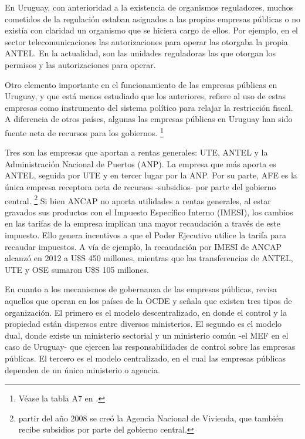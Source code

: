 \documentclass[
  12pt,
  spanish,
]{book}
\begin{document}
En Uruguay, con anterioridad a la existencia de organismos reguladores,
muchos cometidos de la regulación estaban asignados a las propias
empresas públicas o no existía con claridad un organismo que se hiciera
cargo de ellos. Por ejemplo, en el sector telecomunicaciones las
autorizaciones para operar las otorgaba la propia ANTEL. En la
actualidad, son las unidades reguladoras las que otorgan los permisos y
las autorizaciones para operar.

Otro elemento importante en el funcionamiento de las empresas públicas
en Uruguay, y que está menos estudiado que los anteriores, refiere al
uso de estas empresas como instrumento del sistema político para relajar
la restricción fiscal. A diferencia de otros países, algunas las
empresas públicas en Uruguay han sido fuente neta de recursos para los
gobiernos. \footnote{Véase la tabla A7 en \citet{WorldBank1995}.}

Tres son las empresas que aportan a rentas generales: UTE, ANTEL y la
Administración Nacional de Puertos (ANP). La empresa que más aporta es
ANTEL, seguida por UTE y en tercer lugar por la ANP. Por su parte, AFE
es la única empresa receptora neta de recursos -subsidios- por parte del
gobierno central. \footnote{partir del año 2008 se creó la Agencia
  Nacional de Vivienda, que también recibe subsidios por parte del
  gobierno central.} Si bien ANCAP no aporta utilidades a rentas
generales, al estar gravados sus productos con el Impuesto Específico
Interno (IMESI), los cambios en las tarifas de la empresa implican una
mayor recaudación a través de este impuesto. Ello genera incentivos a
que el Poder Ejecutivo utilice la tarifa para recaudar impuestos. A vía
de ejemplo, la recaudación por IMESI de ANCAP alcanzó en 2012 a U\$S 450
millones, mientras que las transferencias de ANTEL, UTE y OSE sumaron
U\$S 105 millones.

En cuanto a los mecanismos de gobernanza de las empresas públicas,
\citet{Vagliasindi2008} revisa aquellos que operan en los países de la
OCDE y señala que existen tres tipos de organización. El primero es el
modelo descentralizado, en donde el control y la propiedad están
dispersos entre diversos ministerios. El segundo es el modelo dual,
donde existe un ministerio sectorial y un ministerio común -el MEF en el
caso de Uruguay- que ejercen las responsabilidades de control sobre las
empresas públicas. El tercero es el modelo centralizado, en el cual las
empresas públicas dependen de un único ministerio o agencia.
\end{document}
